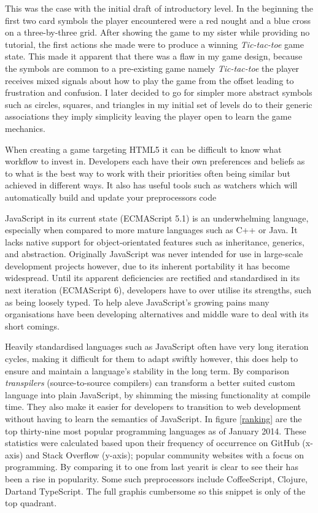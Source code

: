 \documentclass[final]{cmpreport}
\begin{document}
This was the case with the initial draft of introductory level. In the beginning the first two card symbols the player encountered were a red nought and a blue cross on a three-by-three grid. After showing the game to my sister while providing no tutorial, the first actions she made were to produce a winning \emph{Tic-tac-toe} game state. This made it apparent that there was a flaw in my game design, because the symbols are common to a pre-existing game namely \emph{Tic-tac-toe} the player receives mixed signals about how to play the game from the offset leading to frustration and confusion. I later decided to go for simpler more abstract symbols such as circles, squares, and triangles in my initial set of levels do to their generic associations they imply simplicity leaving the player open to learn the game mechanics.

When creating a game targeting HTML5 it can be difficult to know what workflow to invest in. Developers each have their own preferences and beliefs as to what is the best way to work with their priorities often being similar but achieved in different ways. It also has useful tools such as watchers which will automatically build and update your preprocessors code

\label{sec:transpilers}

JavaScript in its current state (ECMAScript 5.1) is an underwhelming language, especially when compared to more mature languages such as C++ or Java. It lacks native support for object-orientated features such as inheritance, generics, and abstraction. Originally JavaScript was never intended for use in large-scale development projects however, due to its inherent portability it has become widespread. Until its apparent deficiencies are rectified and standardised in its next iteration (ECMAScript 6), developers have to over utilise its strengths, such as being loosely typed. To help aleve JavaScript's growing pains many organisations have been developing alternatives and middle ware to deal with its short comings.

Heavily standardised languages such as JavaScript often have very long iteration cycles, making it difficult for them to adapt swiftly however, this does help to ensure and maintain a language's stability in the long term. By comparison \textit{transpilers} (source-to-source compilers) can transform a better suited custom language into plain JavaScript, by shimming the missing functionality at compile time. They also make it easier for developers to transition to web development without having to learn the semantics of JavaScript. In figure \ref{ranking} are the top thirty-nine most popular programming languages as of January 2014. These statistics were calculated based upon their frequency of occurrence on GitHub (x-axis) and Stack Overflow (y-axis); popular community websites with a focus on programming. By comparing it to one from last year\footnotemark it is clear to see their has been a rise in popularity. Some such preprocessors include CoffeeScript\footnotemark, Clojure\footnotemark, Dart\footnotemark and TypeScript\footnotemark. The full graph\footnotemark is cumbersome so this snippet is only of the top quadrant.
\end{document}
